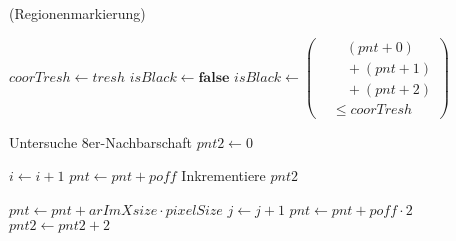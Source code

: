 \begin{algorithm}[!ht]\small
\caption{ (Regionenmarkierung)}
\label{alg:arlabeling-regionlabeling}
\begin{algorithmic}[1]
	\label{alg:arlabeling-regionlabeling-loop1-start}

		\label{alg:arlabeling-regionlabeling-loop2-start}

			\State $\mathit{coorTresh} \gets \mathit{tresh}$
			\label{alg:arlabeling-regionlabeling-threshold-start}
			\State $\mathit{isBlack} \gets \textbf{false}$
			\State $\mathit{isBlack} \gets \left(
			\begin{aligned}
				& \quad (\mathit{pnt} + 0) \\
				& \quad + (\mathit{pnt} + 1) \\
				& \quad + (\mathit{pnt} + 2) \\
				& \leq \mathit{coorTresh}
			\end{aligned}\right)$
			\label{alg:arlabeling-regionlabeling-calcblack}

			\label{alg:arlabeling-regionlabeling-isblack?}
				\State Untersuche 8er-Nachbarschaft
				\label{alg:arlabeling-regionlabeling-black}
			\Else
				\State $\mathit{pnt2} \gets 0$
				\label{alg:arlabeling-regionlabeling-notblack}
			\EndIf
			\label{alg:arlabeling-regionlabeling-threshold-end}

			\State $i \gets i + 1$
			\label{alg:arlabeling-regionlabeling-inc1-start}
			\State $\mathit{pnt} \gets \mathit{pnt} + \mathit{poff}$
			\State Inkrementiere $\mathit{pnt2}$
			\label{alg:arlabeling-regionlabeling-inc1-end}
		\EndFor
		\label{alg:arlabeling-regionlabeling-loop2-end}

		\State $\mathit{pnt} \gets \mathit{pnt} + \mathit{arImXsize} \cdot \mathit{pixelSize}$
		\label{alg:arlabeling-regionlabeling-inc2-start}
		\State $j \gets j + 1$
		\State $\mathit{pnt} \gets \mathit{pnt} + \mathit{poff} \cdot 2$
		\State $\mathit{pnt2} \gets \mathit{pnt2} + 2$
		\label{alg:arlabeling-regionlabeling-inc2-end}
	\EndFor
	\label{alg:arlabeling-regionlabeling-loop1-end}
\end{algorithmic}
\end{algorithm}